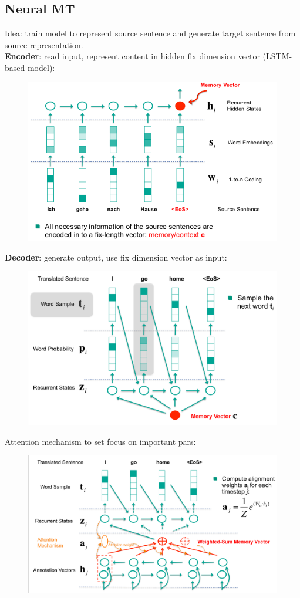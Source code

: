 \subsection{Neural MT}
\label{ssect:neural-mt}
Idea: train model to represent source sentence and generate target sentence from source representation.\\
\textbf{Encoder}: read input, represent content in hidden fix dimension vector (LSTM-based model):
\begin{figure}[h]
\includegraphics[scale=0.4]{encoder}
\end{figure}
\textbf{Decoder}: generate output, use fix dimension vector as input:
\begin{figure}[h]
\includegraphics[scale=0.4]{decoder}
\end{figure}
Attention mechanism to set focus on important pars:
\begin{figure}[t]
\includegraphics[scale=0.4]{attention-mechanism}
\end{figure}\\

